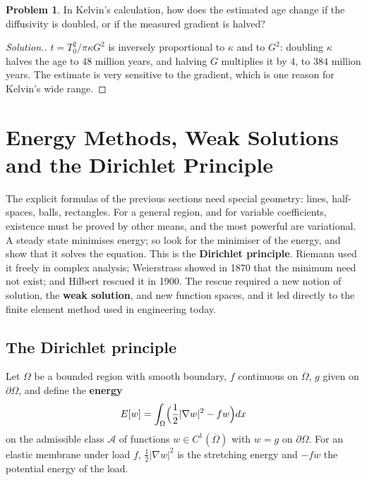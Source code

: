 \documentclass[11pt,a4paper]{article}
\numberwithin{equation}{section}
\theoremstyle{definition}
\newtheorem{problemx}{Problem}[subsection]
\newenvironment{problem}{\begin{problemx}}{\end{problemx}}
\newenvironment{solution}
  {\renewcommand{\qedsymbol}{}\begin{proof}[\textit{Solution}.]}
  {\end{proof}}
\begin{document}
\begin{problem}
In Kelvin's calculation, how does the estimated age change if the diffusivity is doubled, or if the measured gradient is halved?
\end{problem}

\begin{solution}
$t = T_0^2/\pi\kappa G^2$ is inversely proportional to $\kappa$ and to $G^2$: doubling $\kappa$ halves the age to $48$ million years, and halving $G$ multiplies it by $4$, to $384$ million years. The estimate is very sensitive to the gradient, which is one reason for Kelvin's wide range.
\end{solution}

\section{Energy Methods, Weak Solutions and the Dirichlet Principle}
\label{sec:weak}

The explicit formulas of the previous sections need special geometry: lines, half-spaces, balls, rectangles. For a general region, and for variable coefficients, existence must be proved by other means, and the most powerful are variational. A steady state minimises energy; so look for the minimiser of the
energy, and show that it solves the equation. This is the \textbf{Dirichlet principle}. Riemann used it freely in complex analysis; Weierstrass showed in 1870 that the minimum need not exist; and Hilbert rescued it in 1900. The rescue required a new notion of solution, the \textbf{weak solution}, and new function
spaces, and it led directly to the finite element method used in engineering today.

\subsection{The Dirichlet principle}
\label{ssec:dirichletprinciple}

Let $\Omega$ be a bounded region with smooth boundary, $f$ continuous on $\overline\Omega$, $g$ given on $\partial\Omega$, and define the \textbf{energy}
\[
E[w] = \int_\Omega\Bigl(\frac12|\nabla w|^2 - fw\Bigr)dx
\]
on the admissible class $\mathcal A$ of functions $w \in C^1(\overline\Omega)$ with $w = g$ on $\partial\Omega$. For an elastic membrane under load $f$, $\frac12|\nabla w|^2$ is the stretching energy and $-fw$ the potential energy of the load.
\end{document}
